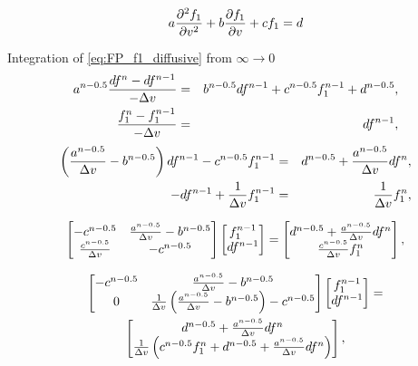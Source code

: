 \documentclass[preprint,12pt]{elsarticle}
\begin{document}
\begin{equation} 
  a \frac{\partial^2 f_1}{\partial v^2} + b \frac{\partial{f_1}}{\partial{v}} + c f_1 
  = d
  \nonumber
\end{equation}

Integration of \eqref{eq:FP_f1_diffusive} from $\infty \rightarrow 0$
\begin{eqnarray}
  a^{n-0.5} \frac{df^n - df^{n-1}}{ - \Delta v} &=& b^{n-0.5} df^{n-1} 
  + c^{n-0.5} f_1^{n-1} + d^{n-0.5} ,
  \nonumber \\
  \frac{f_1^n - f_1^{n-1}}{- \Delta v} &=& df^{n-1} ,
  \nonumber
\end{eqnarray}
\begin{eqnarray}
  \left(\frac{a^{n-0.5}}{\Delta v} - b^{n-0.5}\right) df^{n-1} 
  - c^{n-0.5} f_1^{n-1}&=&  d^{n-0.5} + \frac{a^{n-0.5}}{\Delta v} df^n,
  \nonumber \\
  - df^{n-1} + \frac{1}{\Delta v} f_1^{n-1} &=&  
  \frac{1}{\Delta v} f_1^n ,
  \nonumber
\end{eqnarray}

\begin{equation}
  \begin{bmatrix}
    - c^{n-0.5}  &
	\frac{a^{n-0.5}}{\Delta v} - b^{n-0.5}
    \\
	\frac{c^{n-0.5}}{\Delta v} & -c^{n-0.5} 
  \end{bmatrix}
  \begin{bmatrix}
    f_1^{n-1} \\
    df^{n-1}
  \end{bmatrix}
  =  
  \begin{bmatrix}
    d^{n-0.5} + \frac{a^{n-0.5}}{\Delta v} df^n \\
    \frac{c^{n-0.5}}{\Delta v} f_1^n
  \end{bmatrix}   ,
  \nonumber
\end{equation}

\begin{multline}
  \begin{bmatrix}
    - c^{n-0.5}  &
	\frac{a^{n-0.5}}{\Delta v} - b^{n-0.5} 
    \\
	0 & 
	\frac{1}{\Delta v}
	\left(\frac{a^{n-0.5}}{\Delta v} - b^{n-0.5}\right) - c^{n-0.5} 
  \end{bmatrix}
  \begin{bmatrix}
    f_1^{n-1} \\
    df^{n-1}
  \end{bmatrix}
  =  \\
  \begin{bmatrix}
    d^{n-0.5} + \frac{a^{n-0.5}}{\Delta v} df^n \\
    \frac{1}{\Delta v} \left(c^{n-0.5}f_1^n + 
	d^{n-0.5} + \frac{a^{n-0.5}}{\Delta v} df^n \right) 
  \end{bmatrix}   ,
  \nonumber
\end{multline}
\end{document}
